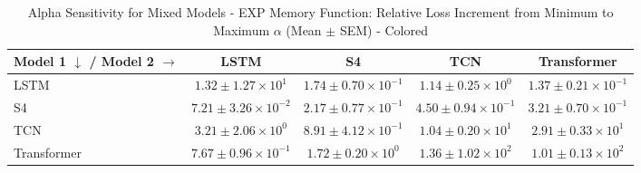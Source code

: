 
\begin{table}[h]
\centering
\caption{Alpha Sensitivity for Mixed Models - EXP Memory Function: Relative Loss Increment from Minimum to Maximum $\alpha$ (Mean $\pm$ SEM) - Colored}
\label{tab:mixed_alpha_sensitivity_exp_colored}
\begin{tabular}{lcccc}
\hline
Model 1 $\downarrow$ / Model 2 $\rightarrow$ & LSTM & S4 & TCN & Transformer \\
\hline
LSTM & \cellcolor{gray!20}$1.32 \pm 1.27 \times 10^{1}$ & \cellcolor{green!30!white}$1.74 \pm 0.70 \times 10^{-1}$ & \cellcolor{green!30!white}$1.14 \pm 0.25 \times 10^{0}$ & \cellcolor{green!30!white}$1.37 \pm 0.21 \times 10^{-1}$ \\
S4 & \cellcolor{green!30!white}$7.21 \pm 3.26 \times 10^{-2}$ & \cellcolor{gray!20}$2.17 \pm 0.77 \times 10^{-1}$ & \cellcolor{green!30!white}$4.50 \pm 0.94 \times 10^{-1}$ & \cellcolor{green!30!white}$3.21 \pm 0.70 \times 10^{-1}$ \\
TCN & \cellcolor{green!30!white}$3.21 \pm 2.06 \times 10^{0}$ & \cellcolor{green!30!white}$8.91 \pm 4.12 \times 10^{-1}$ & \cellcolor{gray!20}$1.04 \pm 0.20 \times 10^{1}$ & \cellcolor{green!28!white}$2.91 \pm 0.33 \times 10^{1}$ \\
Transformer & \cellcolor{green!30!white}$7.67 \pm 0.96 \times 10^{-1}$ & \cellcolor{green!30!white}$1.72 \pm 0.20 \times 10^{0}$ & \cellcolor{red!30!white}$1.36 \pm 1.02 \times 10^{2}$ & \cellcolor{gray!20}$1.01 \pm 0.13 \times 10^{2}$ \\
\hline
\end{tabular}
\end{table}
